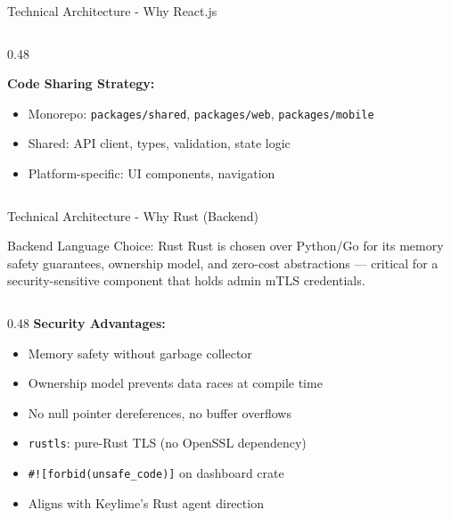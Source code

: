 \begin{frame}{Technical Architecture - Why React.js}
\begin{columns}[T]
\begin{column}{0.48\textwidth}
      \vspace{0.05cm}

      \textbf{Code Sharing Strategy:}
      \begin{itemize}
        \setlength{\itemsep}{0pt}
        \item Monorepo: \texttt{packages/shared}, \texttt{packages/web}, \texttt{packages/mobile}
        \item Shared: API client, types, validation, state logic
        \item Platform-specific: UI components, navigation
      \end{itemize}
    \end{column}
  \end{columns}
\end{frame}

\begin{frame}{Technical Architecture - Why Rust (Backend)}
  \begin{block}{Backend Language Choice: Rust}
    \scriptsize
    Rust is chosen over Python/Go for its memory safety guarantees, ownership model,
    and zero-cost abstractions --- critical for a security-sensitive component that holds
    admin mTLS credentials.
  \end{block}

  \vspace{0.05cm}

  \tiny
  \begin{columns}[T]
    \begin{column}{0.48\textwidth}
      \textbf{Security Advantages:}
      \begin{itemize}
        \setlength{\itemsep}{0pt}
        \item Memory safety without garbage collector
        \item Ownership model prevents data races at compile time
        \item No null pointer dereferences, no buffer overflows
        \item \texttt{rustls}: pure-Rust TLS (no OpenSSL dependency)
        \item \texttt{\#![forbid(unsafe\_code)]} on dashboard crate
        \item Aligns with Keylime's Rust agent direction
      \end{itemize}

      \vspace{0.05cm}


\end{column}
\end{columns}
\end{frame}
